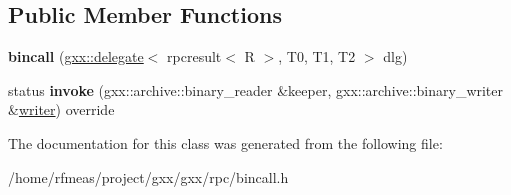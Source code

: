 \subsection*{Public Member Functions}
\begin{DoxyCompactItemize}
\item 
{\bfseries bincall} (\hyperlink{classgxx_1_1delegate}{gxx\+::delegate}$<$ rpcresult$<$ R $>$, T0, T1, T2 $>$ dlg)\hypertarget{classgxx_1_1rpc_1_1bincall_3_01gxx_1_1delegate_3_01R_00_01T0_00_01T1_00_01T2_01_4_01_4_add91072889278f4ddd8bc3fdb3160b0d}{}\label{classgxx_1_1rpc_1_1bincall_3_01gxx_1_1delegate_3_01R_00_01T0_00_01T1_00_01T2_01_4_01_4_add91072889278f4ddd8bc3fdb3160b0d}

\item 
status {\bfseries invoke} (gxx\+::archive\+::binary\+\_\+reader \&keeper, gxx\+::archive\+::binary\+\_\+writer \&\hyperlink{classgxx_1_1writer}{writer}) override\hypertarget{classgxx_1_1rpc_1_1bincall_3_01gxx_1_1delegate_3_01R_00_01T0_00_01T1_00_01T2_01_4_01_4_a07f96fda38a384a9ffacdbcb4c2c2493}{}\label{classgxx_1_1rpc_1_1bincall_3_01gxx_1_1delegate_3_01R_00_01T0_00_01T1_00_01T2_01_4_01_4_a07f96fda38a384a9ffacdbcb4c2c2493}

\end{DoxyCompactItemize}


The documentation for this class was generated from the following file\+:\begin{DoxyCompactItemize}
\item 
/home/rfmeas/project/gxx/gxx/rpc/bincall.\+h\end{DoxyCompactItemize}
